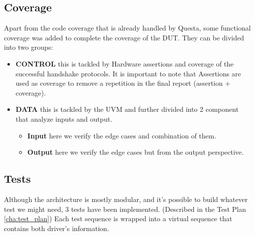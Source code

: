 \subsection*{Coverage}
Apart from the code coverage that is already handled by Questa, some functional coverage was added to complete the coverage of the DUT.
They can be divided into two groups:
\begin{itemize}
    \item \textbf{CONTROL} this is tackled by Hardware assertions and coverage of the successful handshake protocols.
    It is important to note that Assertions are used as coverage to remove a repetition in the final report (assertion + coverage).
    \item \textbf{DATA} this is tackled by the UVM and further divided into 2 component that analyze inputs and output.
    \begin{itemize}
        \item \textbf{Input} here we verify the edge cases and combination of them.
        \item \textbf{Output} here we verify the edge cases but from the output perspective.
    \end{itemize}
\end{itemize}

\subsection*{Tests}
Although the architecture is mostly modular, and it's possible to build whatever test we might need, 3 tests have been implemented.
(Described in the Test Plan \ref{cha:test_plan})
Each test sequence is wrapped into a virtual sequence that contains both driver's information.